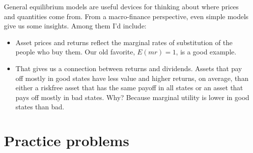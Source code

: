 \documentclass[11pt]{article}
\begin{document}
General equilibrium models are useful devices for thinking
about where prices and quantities come from.
From a macro-finance perspective,
even simple models give us some insights.
Among them I'd include:
%
\begin{itemize}
\item Asset prices and returns reflect the marginal rates of substitution
of the people who buy them.
Our old favorite, $E(mr) = 1$, is a good example.
\item That gives us a connection between returns and dividends.
Assets that pay off mostly in good states have less value
and higher returns, on average,
than either a riskfree asset that has the same payoff in all states
or an asset that pays off mostly in bad states.
Why?  Because marginal utility is lower in good states than bad.
\end{itemize}

\section*{Practice problems}
\end{document}

